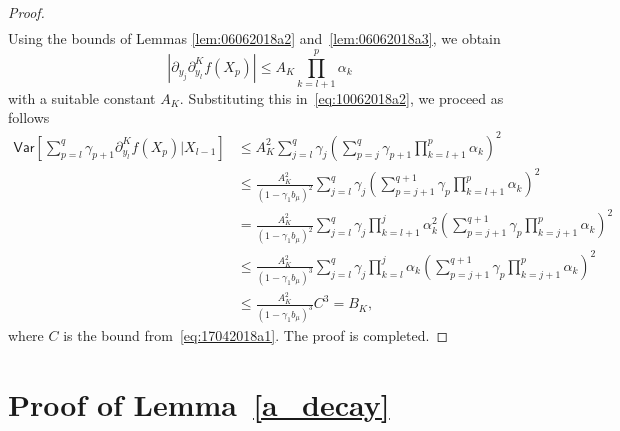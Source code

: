 \documentclass[article]{elsarticle}
\begin{document}
\begin{proof}
\begin{align*}
\end{align*}
Using the bounds of
Lemmas \ref{lem:06062018a2} and~\ref{lem:06062018a3},
we obtain
\[
\left|\partial_{y_{j}}\partial_{y_{l}}^{K}f\left(X_{p}\right)\right|
\leq A_{K}\prod_{k=l+1}^{p}\alpha_{k}
\]
with a suitable constant $A_{K}$.
Substituting this in~\eqref{eq:10062018a2},
we proceed as follows
\begin{align*}
\mathsf{Var}\left[\sum_{p=l}^{q}\gamma_{p+1}\partial_{y_{l}}^{K}f\left(X_{p}\right)\Big|X_{l-1}\right]
&\le
A_{K}^{2}\sum_{j=l}^{q}\gamma_{j}
\left(\sum_{p=j}^{q}\gamma_{p+1}\prod_{k=l+1}^{p}\alpha_{k}\right)^{2}
\\
&\le
\frac{A_{K}^{2}}{(1-\gamma_1 b_\mu)^2}
\sum_{j=l}^{q} \gamma_{j}
\left(
\sum_{p=j+1}^{q+1} \gamma_{p} \prod_{k=l+1}^{p} \alpha_{k}
\right)^{2}
\\
&=
\frac{A_{K}^{2}}{(1-\gamma_1 b_\mu)^2}
\sum_{j=l}^{q} \gamma_{j}
\prod_{k=l+1}^{j} \alpha_{k}^2
\left(
\sum_{p=j+1}^{q+1} \gamma_{p} \prod_{k=j+1}^{p} \alpha_{k}
\right)^{2}
\\
&\le
\frac{A_{K}^{2}}{(1-\gamma_1 b_\mu)^3}
\sum_{j=l}^{q} \gamma_{j}
\prod_{k=l}^{j} \alpha_{k}
\left(
\sum_{p=j+1}^{q+1} \gamma_{p} \prod_{k=j+1}^{p} \alpha_{k}
\right)^{2}
\\
&\le
\frac{A_{K}^{2}}{(1-\gamma_1 b_\mu)^3}C^3=B_K,
\end{align*}
where $C$ is the bound from~\eqref{eq:17042018a1}.
The proof is completed.
\end{proof}

\section{Proof of Lemma~\ref{a_decay}}
\end{document}
